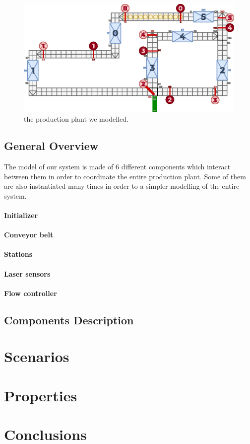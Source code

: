 \documentclass[a4paper]{article}
\begin{document}
    \begin{figure}[h]
        \includegraphics[width=\columnwidth]{./images/plant}
        \caption{the production plant we modelled.}
    \end{figure}


    \subsection{General Overview}

    The model of our system is made of 6 different components which interact between them in order to coordinate the entire production plant. Some of them are also instantiated many times in order to a simpler modelling of the entire system.

    \paragraph{Initializer}

    \paragraph{Conveyor belt}

    \paragraph{Stations}

    \paragraph{Laser sensors}

    \paragraph{Flow controller}

    \subsection{Components Description}

    \section{Scenarios}

    \section{Properties}

    \section{Conclusions}
\end{document}
